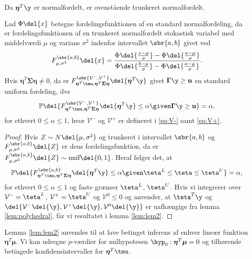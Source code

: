Da \(\boldsymbol{\eta}^T \y\) er normalfordelt, er ovenstående trunkeret normalfordelt.
%
\begin{lem}  \label{lem:lem2}
Lad \(\Phi \del{x}\) betegne fordelingsfunktionen af en standard normalfordeling, da er fordelingsfunktionen af en trunkeret normalfordelt stokastisk variabel med middelværdi \(\mu\) og varians \(\sigma^2\) indenfor intervallet \(\sbr{a,b}\) givet ved
\begin{align*}
F_{\mu, \sigma^2}^{\sbr{a,b}} \del{x} = \frac{\Phi\del{\frac{x-\mu}{\sigma}} - \Phi\del{\frac{a-\mu}{\sigma}}}{\Phi\del{\frac{b-\mu}{\sigma}} - \Phi\del{\frac{a-\mu}{\sigma}}}.
\end{align*}
Hvis \(\boldsymbol{\eta}^T \boldsymbol{\Sigma} \boldsymbol{\eta} \neq 0\), da er \(F_{\boldsymbol{\eta}^T \tmu, \boldsymbol{\eta}^T \boldsymbol{\Sigma} \boldsymbol{\eta}}^{\sbr{\mathcal{V}^-,\mathcal{V}^+}} \del{\boldsymbol{\eta}^T \y} \) givet \(\boldsymbol{\Gamma} \y \geq \mathbf{u}\) en standard uniform fordeling, dvs
\begin{align*}
\mathbb{P} \del{F_{\boldsymbol{\eta}^T \tmu, \boldsymbol{\eta}^T \boldsymbol{\Sigma} \boldsymbol{\eta}}^{\sbr{\mathcal{V}^-,\mathcal{V}^+}} \del{\boldsymbol{\eta}^T \y} \leq \alpha \given \boldsymbol{\Gamma} \y \geq \mathbf{u}} = \alpha, 
\end{align*}
for ethvert \(0 \leq \alpha \leq 1\), hvor \(\mathcal{V}^-\) og \(\mathcal{V}^+\) er defineret i \eqref{eq:V-} samt \eqref{eq:V+}. 
\end{lem}
%
\begin{proof}
Hvis \(Z \sim N \del{\mu, \sigma^2}\) og trunkeret i intervallet \(\sbr{a,b}\) og \(F_{\mu, \sigma^2}^{\sbr{a,b}} \del{Z}\) er dens fordelingsfunktion, da er \(F_{\mu, \sigma^2}^{\sbr{a,b}} \del{Z} \sim \text{unif} \del{0,1}\).
Heraf følger det, at
\begin{align*}
\mathbb{P} \del{F_{\boldsymbol{\eta}^T \tmu, \boldsymbol{\eta}^T \boldsymbol{\Sigma} \boldsymbol{\eta}}^{\sbr{a,b}} \del{\boldsymbol{\eta}^T \y} \leq \alpha \given \teta^L \leq \teta \leq \teta^U} = \alpha, 
\end{align*}
for ethvert  \(0 \leq \alpha \leq 1\) og faste grænser \(\teta^L\), \(\teta^U\).
Hvis vi integrerer over \(\mathcal{V}^- = \teta^L\), \(\mathcal{V}^+ = \teta^U\) og \(\mathcal{V}^0 \leq 0\) og anvender, at \(\teta^T \y\) og \(\del{\mathcal{V}^-\del{\y}, \mathcal{V}^+\del{\y},\mathcal{V}^0\del{\y}}\) er uafhængige fra lemma \ref{lem:polyhedral}, får vi resultatet i lemma \ref{lem:lem2}.
\end{proof}
Lemma \ref{lem:lem2} anvendes til at lave betinget inferens af enhver lineær funktion \(\boldsymbol{\eta}^T \boldsymbol{\mu}\).
Vi kan udregne \(p\)-værdier for nulhypotesen \(\hyp_0: \boldsymbol{\eta}^T \boldsymbol{\mu}=0\) og tilhørende betingede konfidensintervaller for \(\boldsymbol{\eta}^T \tmu\).

